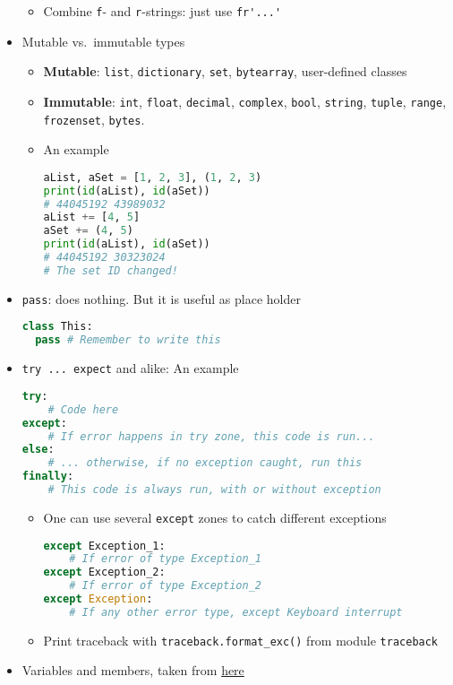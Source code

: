 \documentclass[a4paper,12pt,%
              final%
              ]{article}
\begin{document}
\begin{itemize}
\begin{itemize}
      \item Combine \texttt{f}- and \texttt{r}-strings: just use \verb|fr'...'|
    \end{itemize}
  \item Mutable vs.\ immutable types
    \begin{itemize}
      \item \textbf{Mutable}: \texttt{list}, \texttt{dictionary}, \texttt{set}, \texttt{bytearray}, user-defined classes
      \item \textbf{Immutable}: \texttt{int}, \texttt{float}, \texttt{decimal}, \texttt{complex}, \texttt{bool}, \texttt{string}, \texttt{tuple}, \texttt{range}, \texttt{frozenset}, \texttt{bytes}.
      \item An example
\begin{lstlisting}[language=python]
aList, aSet = [1, 2, 3], (1, 2, 3)
print(id(aList), id(aSet))
# 44045192 43989032
aList += [4, 5]
aSet += (4, 5)
print(id(aList), id(aSet))
# 44045192 30323024
# The set ID changed!
\end{lstlisting}
    \end{itemize}
  \item \verb|pass|: does nothing. But it is useful as place holder
\begin{lstlisting}[language=python]
class This:
  pass # Remember to write this
\end{lstlisting}
  \item \verb|try ... expect| and alike: An example
\begin{lstlisting}[language=python]
try:
    # Code here
except:
    # If error happens in try zone, this code is run...
else:
    # ... otherwise, if no exception caught, run this
finally:
    # This code is always run, with or without exception
\end{lstlisting}
    \begin{itemize}
      \item One can use several \texttt{except} zones to catch different exceptions
\begin{lstlisting}[language=python]
except Exception_1:
    # If error of type Exception_1
except Exception_2:
    # If error of type Exception_2
except Exception:
    # If any other error type, except Keyboard interrupt
\end{lstlisting}
      \item Print traceback with \verb|traceback.format_exc()| from module \texttt{traceback}
    \end{itemize}
  \item Variables and members, taken from \href{https://stackoverflow.com/questions/7969949/whats-the-difference-between-globals-locals-and-vars}{here}

\end{itemize}
\end{document}
